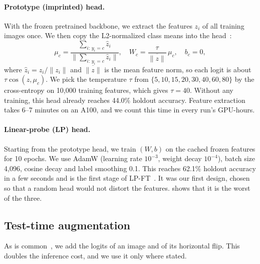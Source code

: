 \paragraph{Prototype (imprinted) head.}
With the frozen pretrained backbone, we extract the features $z_i$ of all training images once.
We then copy the L2-normalized class means into the head~\cite{snell2017prototypical,qi2018imprinted}:
\begin{equation}
  \mu_c = \frac{\sum_{i:\,y_i=c} \hat z_i}{\big\|\sum_{i:\,y_i=c} \hat z_i\big\|}, \quad
  W_c = \frac{\tau}{\overline{\|z\|}}\, \mu_c, \quad b_c = 0,
  \label{eq:proto}
\end{equation}
where $\hat z_i = z_i / \|z_i\|$ and $\overline{\|z\|}$ is the mean feature norm, so each logit is about $\tau \cos(z, \mu_c)$.
We pick the temperature $\tau$ from $\{5, 10, 15, 20, 30, 40, 60, 80\}$ by the cross-entropy on 10,000 training features, which gives $\tau = 40$.
Without any training, this head already reaches 44.0\% holdout accuracy.
Feature extraction takes 6--7 minutes on an A100, and we count this time in every run's GPU-hours.

\paragraph{Linear-probe (LP) head.}
Starting from the prototype head, we train $(W, b)$ on the cached frozen features for 10 epochs.
We use AdamW (learning rate $10^{-3}$, weight decay $10^{-4}$), batch size 4,096, cosine decay and label smoothing 0.1.
This reaches 62.1\% holdout accuracy in a few seconds and is the first stage of LP-FT~\cite{kumar2022lpft}.
It was our first design, chosen so that a random head would not distort the features.
 shows that it is the worst of the three.

\subsection{Test-time augmentation}
As is common~\cite{krizhevsky2012imagenet}, we add the logits of an image and of its horizontal flip.
This doubles the inference cost, and we use it only where stated.
